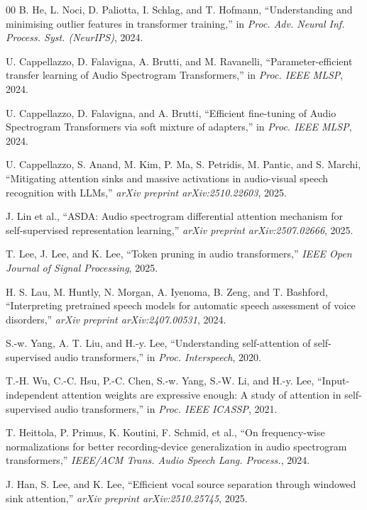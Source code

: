 \documentclass[conference]{IEEEtran}
\begin{document}
\begin{thebibliography}{00}
B. He, L. Noci, D. Paliotta, I. Schlag, and T. Hofmann, ``Understanding and minimising outlier features in transformer training,'' in \emph{Proc. Adv. Neural Inf. Process. Syst. (NeurIPS)}, 2024.

U. Cappellazzo, D. Falavigna, A. Brutti, and M. Ravanelli, ``Parameter-efficient transfer learning of Audio Spectrogram Transformers,'' in \emph{Proc. IEEE MLSP}, 2024.

U. Cappellazzo, D. Falavigna, and A. Brutti, ``Efficient fine-tuning of Audio Spectrogram Transformers via soft mixture of adapters,'' in \emph{Proc. IEEE MLSP}, 2024.

U. Cappellazzo, S. Anand, M. Kim, P. Ma, S. Petridis, M. Pantic, and S. Marchi, ``Mitigating attention sinks and massive activations in audio-visual speech recognition with LLMs,'' \emph{arXiv preprint arXiv:2510.22603}, 2025.

J. Lin et al., ``ASDA: Audio spectrogram differential attention mechanism for self-supervised representation learning,'' \emph{arXiv preprint arXiv:2507.02666}, 2025.

T. Lee, J. Lee, and K. Lee, ``Token pruning in audio transformers,'' \emph{IEEE Open Journal of Signal Processing}, 2025.

H. S. Lau, M. Huntly, N. Morgan, A. Iyenoma, B. Zeng, and T. Bashford, ``Interpreting pretrained speech models for automatic speech assessment of voice disorders,'' \emph{arXiv preprint arXiv:2407.00531}, 2024.

S.-w. Yang, A. T. Liu, and H.-y. Lee, ``Understanding self-attention of self-supervised audio transformers,'' in \emph{Proc. Interspeech}, 2020.

T.-H. Wu, C.-C. Hsu, P.-C. Chen, S.-w. Yang, S.-W. Li, and H.-y. Lee, ``Input-independent attention weights are expressive enough: A study of attention in self-supervised audio transformers,'' in \emph{Proc. IEEE ICASSP}, 2021.

T. Heittola, P. Primus, K. Koutini, F. Schmid, et al., ``On frequency-wise normalizations for better recording-device generalization in audio spectrogram transformers,'' \emph{IEEE/ACM Trans. Audio Speech Lang. Process.}, 2024.

J. Han, S. Lee, and K. Lee, ``Efficient vocal source separation through windowed sink attention,'' \emph{arXiv preprint arXiv:2510.25745}, 2025.

\end{thebibliography}
\end{document}
